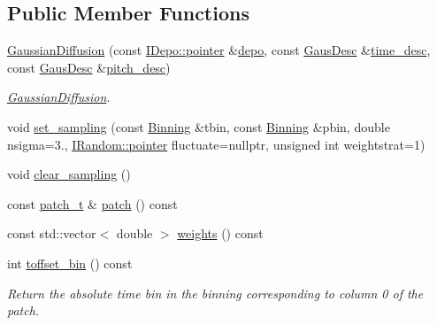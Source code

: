 \subsection*{Public Member Functions}
\begin{DoxyCompactItemize}
\item 
\hyperlink{class_wire_cell_1_1_gen_1_1_gaussian_diffusion_a1c53023e228cad69ccc12b9133ade785}{Gaussian\+Diffusion} (const \hyperlink{class_wire_cell_1_1_i_data_aff870b3ae8333cf9265941eef62498bc}{I\+Depo\+::pointer} \&\hyperlink{class_wire_cell_1_1_gen_1_1_gaussian_diffusion_af47821d09cdf3b3db6e7ffe8e9a70fb9}{depo}, const \hyperlink{struct_wire_cell_1_1_gen_1_1_gaus_desc}{Gaus\+Desc} \&\hyperlink{class_wire_cell_1_1_gen_1_1_gaussian_diffusion_a7c3c7dbfeb34c5cb778c873343772427}{time\+\_\+desc}, const \hyperlink{struct_wire_cell_1_1_gen_1_1_gaus_desc}{Gaus\+Desc} \&\hyperlink{class_wire_cell_1_1_gen_1_1_gaussian_diffusion_a356c64883ec23fcf9c5b2ef056cf4888}{pitch\+\_\+desc})
\begin{DoxyCompactList}\small\item\em \hyperlink{class_wire_cell_1_1_gen_1_1_gaussian_diffusion}{Gaussian\+Diffusion}. \end{DoxyCompactList}\item 
void \hyperlink{class_wire_cell_1_1_gen_1_1_gaussian_diffusion_aee13d3eff7f4d5b15d2bffd7b982fae4}{set\+\_\+sampling} (const \hyperlink{class_wire_cell_1_1_binning}{Binning} \&tbin, const \hyperlink{class_wire_cell_1_1_binning}{Binning} \&pbin, double nsigma=3., \hyperlink{class_wire_cell_1_1_interface_a09c548fb8266cfa39afb2e74a4615c37}{I\+Random\+::pointer} fluctuate=nullptr, unsigned int weightstrat=1)
\item 
void \hyperlink{class_wire_cell_1_1_gen_1_1_gaussian_diffusion_ad943ff4bdd0f751f983b375b725e4d45}{clear\+\_\+sampling} ()
\item 
const \hyperlink{class_wire_cell_1_1_gen_1_1_gaussian_diffusion_a33cd8c39349ac40f3757405be6d8f7b0}{patch\+\_\+t} \& \hyperlink{class_wire_cell_1_1_gen_1_1_gaussian_diffusion_a0917ea09022f97d0274ee90b6aeb97b8}{patch} () const
\item 
const std\+::vector$<$ double $>$ \hyperlink{class_wire_cell_1_1_gen_1_1_gaussian_diffusion_ac69c89a9e8b3947efcd56de6055dfb47}{weights} () const
\item 
int \hyperlink{class_wire_cell_1_1_gen_1_1_gaussian_diffusion_a665f92ab11b075189936553e8cf5e681}{toffset\+\_\+bin} () const
\begin{DoxyCompactList}\small\item\em Return the absolute time bin in the binning corresponding to column 0 of the patch. \end{DoxyCompactList}\item 

\end{DoxyCompactItemize}
